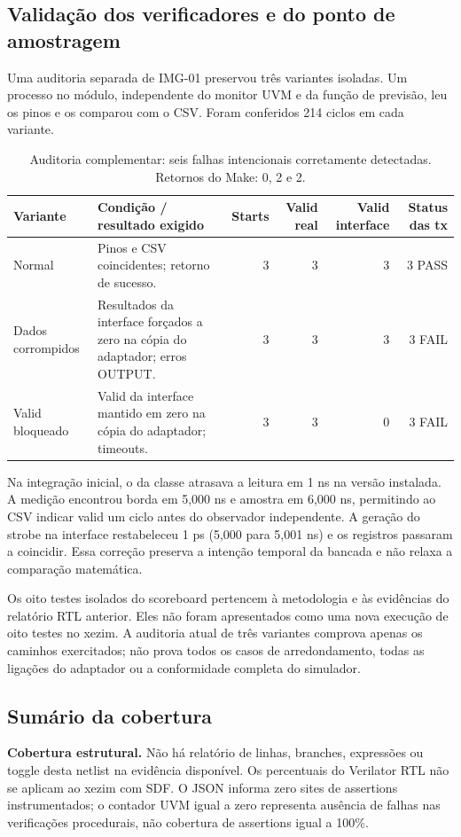 \documentclass[12pt,a4paper]{article}
\newcommand{\arquivo}[1]{\texttt{\detokenize{#1}}}
\begin{document}
\subsection{Validação dos verificadores e do ponto de amostragem}
Uma auditoria separada de IMG-01 preservou três variantes isoladas. Um processo no módulo, independente do monitor UVM e da função de previsão, leu os pinos e os comparou com o CSV. Foram conferidos 214 ciclos em cada variante.
\begin{table}[H]\centering\small
\begin{tabularx}{\textwidth}{p{4.5cm}Xrrrr}\toprule
\textbf{Variante} & \textbf{Condição / resultado exigido} & \textbf{Starts} & \textbf{Valid real} & \textbf{Valid interface} & \textbf{Status das tx}\\\midrule
Normal & Pinos e CSV coincidentes; retorno de sucesso. & 3 & 3 & 3 & 3 PASS\\
Dados corrompidos & Resultados da interface forçados a zero na cópia do adaptador; erros OUTPUT. & 3 & 3 & 3 & 3 FAIL\\
Valid bloqueado & Valid da interface mantido em zero na cópia do adaptador; timeouts. & 3 & 3 & 0 & 3 FAIL\\\bottomrule
\end{tabularx}
\caption{Auditoria complementar: seis falhas intencionais corretamente detectadas. Retornos do Make: 0, 2 e 2.}
\end{table}
Na integração inicial, o \arquivo{#1ps} da classe atrasava a leitura em 1 ns na versão instalada. A medição encontrou borda em 5,000 ns e amostra em 6,000 ns, permitindo ao CSV indicar valid um ciclo antes do observador independente. A geração do strobe na interface restabeleceu 1 ps (5,000 para 5,001 ns) e os registros passaram a coincidir. Essa correção preserva a intenção temporal da bancada e não relaxa a comparação matemática.

Os oito testes isolados do scoreboard pertencem à metodologia e às evidências do relatório RTL anterior. Eles não foram apresentados como uma nova execução de oito testes no xezim. A auditoria atual de três variantes comprova apenas os caminhos exercitados; não prova todos os casos de arredondamento, todas as ligações do adaptador ou a conformidade completa do simulador.

\subsection{Sumário da cobertura}
\textbf{Cobertura estrutural.} Não há relatório de linhas, branches, expressões ou toggle desta netlist na evidência disponível. Os percentuais do Verilator RTL não se aplicam ao xezim com SDF. O JSON informa zero sites de assertions instrumentados; o contador UVM igual a zero representa ausência de falhas nas verificações procedurais, não cobertura de assertions igual a 100\%.
\end{document}
